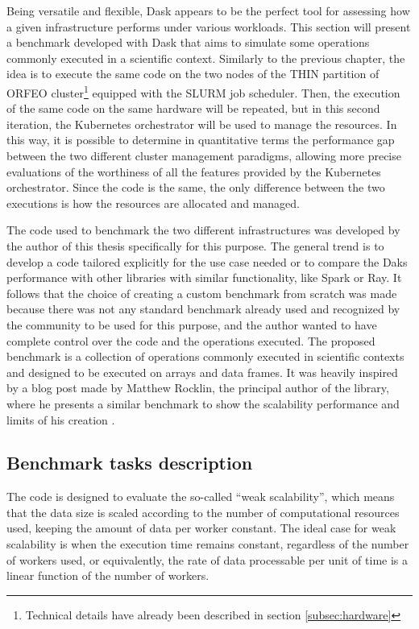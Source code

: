 Being versatile and flexible, Dask appears to be the perfect tool for assessing
how a given infrastructure performs under various workloads.
This section will present a benchmark developed with Dask that aims to simulate
some operations commonly executed in a scientific context.
Similarly to the previous chapter, the idea is to execute the same code on the
two nodes of the THIN partition of ORFEO cluster\footnote{Technical details have
  already been described in section \ref{subsec:hardware}} equipped with the
SLURM job scheduler. Then, the execution of the same code on the same hardware
will be repeated, but in this second iteration, the Kubernetes orchestrator will
be used to manage the resources.
In this way, it is possible to determine in quantitative terms the performance
gap between the two different cluster management paradigms, allowing more
precise evaluations of the worthiness of all the features provided by the
Kubernetes orchestrator.
Since the code is the same, the only difference between the two executions is
how the resources are allocated and managed.

The code used to benchmark the two different infrastructures was developed by
the author of this thesis specifically for this purpose.
The general trend is to develop a code tailored explicitly for the use case
needed or to compare the Daks performance with other libraries with similar
functionality, like Spark or Ray.
It follows that the choice of creating a custom benchmark from scratch was made
because there was not any standard benchmark already used and recognized by the
community to be used for this purpose, and the author wanted to have complete
control over the code and the operations executed.
The proposed benchmark is a collection of operations commonly executed in
scientific contexts and designed to be executed on arrays and data frames.
It was heavily inspired by a blog post made by Matthew Rocklin, the principal
author of the library, where he presents a similar benchmark to show the
scalability performance and limits of his creation \cite{Rocklinblog}.

\subsection{Benchmark tasks description}\label{subsec:benchmarktasks}

The code is designed to evaluate the so-called ``weak scalability'', which means
that the data size is scaled according to the number of computational resources
used, keeping the amount of data per worker constant. The ideal case for weak
scalability is when the execution time remains constant, regardless of the
number of workers used, or equivalently, the rate of data processable per unit
of time is a linear function of the number of workers.

